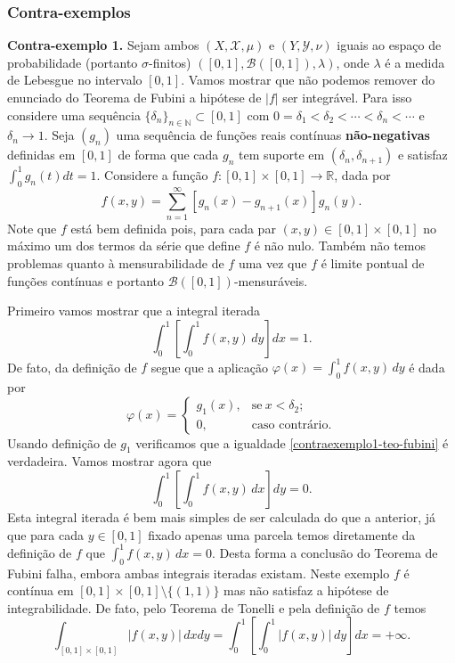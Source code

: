 \subsubsection{Contra-exemplos}

\noindent\textbf{Contra-exemplo 1.} 
Sejam ambos $(X, \mathscr{X}, \mu)$ e $(Y, \mathscr{Y}, \nu)$
iguais ao espaço de probabilidade (portanto $\sigma$-finitos) 
$([0,1],\mathscr{B}([0,1]),\lambda)$, 
onde $\lambda$ é a medida de Lebesgue no intervalo $[0,1]$.
Vamos mostrar que não podemos remover do enunciado do 
Teorema de Fubini a hipótese de $|f|$ ser integrável. 
Para isso considere uma sequência 
$\{\delta_n\}_{n\in\mathbb{N} }\subset [0,1]$ 
com $0=\delta_1<\delta_2<\cdots <\delta_n<\cdots $ 
e $\delta_n\to 1$. 
Seja $(g_n)$ uma sequência de funções reais 
contínuas \textbf{não-negativas} 
definidas em $[0,1]$ de forma que cada $g_n$ 
tem suporte em $(\delta_n,\delta_{n+1})$ e satisfaz 
$\int_{0}^{1}g_n(t)dt=1$. 
Considere a função  $f:[0,1]\times [0,1]\to \mathbb{R}$,
dada por
\[ 
f(x,y)=\sum_{n=1}^{\infty}[g_n(x)-g_{n+1}(x)]g_n(y).
\]
Note que $f$ está bem definida pois, 
para cada par $(x,y)\in [0,1]\times[0,1]$ 
no máximo um dos termos da 
série que define $f$ é não nulo. 
Também não temos problemas quanto à 
mensurabilidade de $f$ uma vez que $f$ é 
limite pontual de funções contínuas e portanto
$\mathscr{B}([0,1])$-mensuráveis. 

Primeiro vamos mostrar que a integral iterada  
\begin{equation}\label{contraexemplo1-teo-fubini}
\int_{0}^1 \left[ \int_{0}^{1}f(x,y)\, dy\right] dx = 1.
\end{equation}
De fato, da definição de $f$ segue que a aplicação 
$\varphi(x)= \int_{0}^{1}f(x,y)\, dy$ é dada por 
\[
\varphi(x)
=
\begin{cases}
g_1(x),&\text{se}\ x<\delta_2;
\\
0,&\text{caso contrário.}
\end{cases}
\]
Usando definição de $g_1$ verificamos que 
a igualdade \ref{contraexemplo1-teo-fubini} é verdadeira.
Vamos mostrar agora que
\begin{equation}\label{contraexemplo1-teo-fubini}
\int_{0}^1 \left[ \int_{0}^{1}f(x,y)\, dx\right] dy = 0.
\end{equation}
Esta integral iterada é bem mais simples de ser calculada
do que a anterior, já que 
para cada $y\in [0,1]$ fixado apenas uma parcela 
temos diretamente da definição de $f$ que 
$\int_{0}^{1}f(x,y)\, dx=0$.
Desta forma a conclusão do Teorema de Fubini falha,
embora ambas integrais iteradas existam. 
Neste exemplo $f$ é contínua em 
$[0,1]\times[0,1]\setminus\{(1,1)\}$ mas não satisfaz 
a hipótese de integrabilidade. 
De fato, pelo Teorema de Tonelli 
e pela definição de $f$ temos 
\[
\int_{[0,1]\times [0,1]} |f(x,y)|\, dxdy
= 
\int_{0}^1 \left[ \int_{0}^{1}|f(x,y)|\, dy\right] dx = +\infty.
\]






